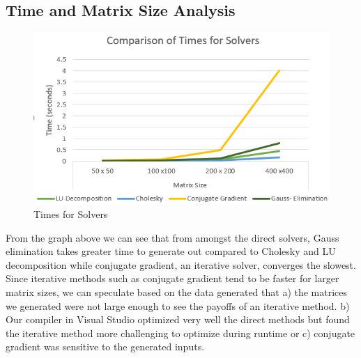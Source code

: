 \documentclass[twoside,twocolumn]{article}
\begin{document}
\subsection{Time and Matrix Size Analysis}

\begin{figure}[H]
    \centering
    \includegraphics[width=\linewidth]{Times for Solvers}
    \caption{Times for Solvers}
    \label{fig:my_label}
\end{figure}

From the graph above we can see that from amongst the direct solvers, Gauss elimination takes greater  time to generate out compared to Cholesky and LU decomposition while conjugate gradient, an iterative solver, converges the slowest. Since iterative methods such as conjugate gradient tend to be faster for larger matrix sizes, we can speculate based on the data generated that a) the matrices we generated were not large enough to see the payoffs of an iterative method. b) Our compiler in Visual Studio optimized very well the direct methods but found the iterative method more challenging to optimize during runtime or c) conjugate gradient was sensitive to the generated inputs. 
\end{document}
